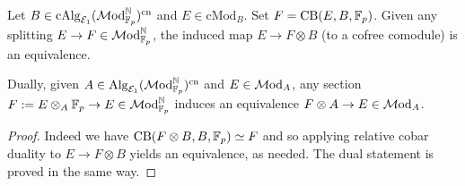 \documentclass{amsart}
\numberwithin{proposition}{section}
\numberwithin{equation}{section}
\newcommand{\cMod}{\mathrm{cMod}}
\def\cn{\mathrm{cn}}
\newcommand{\CB}{\mathrm{CB}}
\begin{document}
\begin{lemma} \label{lemm:cAlg-fiber-splitting}
Let $B \in \cAlg_{\scr E_1}(\Mod_{\F_p}^\N)^\cn$ and $E \in \cMod_B$.
Set $F = \CB(E, B, \F_p)$.
Given any splitting $E \to F \in \mathcal{M}\mathrm{od}_{\mathbb{F}_p}^{\mathbb{N}}$, the induced map $E \to F \otimes B$ (to a cofree comodule) is an equivalence.

Dually, given $A \in \Alg_{\scr E_1}(\Mod_{\F_p}^\N)^\cn$ and $E \in \mathcal{M}\mathrm{od}_A$, any section $F := E \otimes_A \mathbb{F}_p \to E \in \mathcal{M}\mathrm{od}_{\mathbb{F}_p}^{\mathbb{N}}$ induces an equivalence $F \otimes A \to E \in \mathcal{M}\mathrm{od}_A$.
\end{lemma}
\begin{proof}
Indeed we have $\CB(F \otimes B, B, \F_p) \wequi F$ and so applying relative cobar duality to $E \to F \otimes B$ yields an equivalence, as needed.
The dual statement is proved in the same way.
\end{proof}
\end{document}
